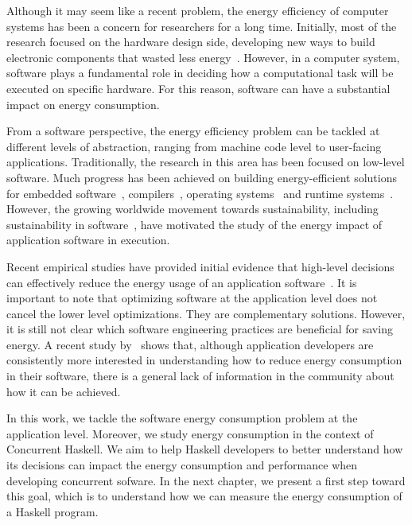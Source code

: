 Although it may seem like a recent problem, the energy efficiency of computer systems has been a concern for researchers for a long time. Initially, most of the research focused on the hardware design side, developing new ways to build electronic components that wasted less energy~\cite{chandrakasan:1992}. However, in a computer system, software plays a fundamental role in deciding how a computational task will be executed on specific hardware. For this reason, software can have a substantial impact on energy consumption.

From a software perspective, the energy efficiency problem can be tackled at different levels of abstraction, ranging from machine code level to user-facing applications. Traditionally, the research in this area has been focused on low-level software. Much progress has been achieved on building energy-efficient solutions for embedded software~\cite{tiwari:1994}, compilers~\cite{hsu:2003}, operating systems~\cite{merkel:2006} and runtime systems~\cite{ribic:2014, farkas:2000}. However, the growing worldwide movement towards sustainability, including sustainability in software~\cite{becker:2015}, have motivated the study of the energy impact of application software in execution.

Recent empirical studies have provided initial evidence that high-level decisions can effectively reduce the energy usage of an application software~\cite{chung:2001,hindle:2012,pinto:2014,trefethen:2013,manotas:2014, sahin:2012,sahin:2014}. It is important to note that optimizing software at the application level does not cancel the lower level optimizations. They are complementary solutions. However, it is still not clear which software engineering practices are beneficial for saving energy. A recent study by~\cite{pinto:2014b} shows that, although application developers are consistently more interested in understanding how to reduce energy consumption in their software, there is a general lack of information in the community about how it can be achieved.

In this work, we tackle the software energy consumption problem at the application level. Moreover, we study energy consumption in the context of Concurrent Haskell. We aim to help Haskell developers to better understand how its decisions can impact the energy consumption and performance when developing  concurrent sofware. In the next chapter, we present a first step toward this goal, which is to understand how we can measure the energy consumption of a Haskell program.
